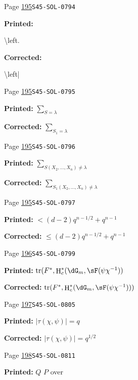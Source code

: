 \documentclass[oneside]{book}
\DeclareMathOperator{\h}{H}
\DeclareMathOperator{\tr}{tr}
\theoremstyle{sga-source}
\theoremstyle{sga-source-dash}
\theoremstyle{sga-source-dotdash}
\theoremstyle{sga-source-number-note-dash}
\theoremstyle{sga-source-note-number-dotdash}
\theoremstyle{sga-source-example-dotdash}
\theoremstyle{sga-source-inline-number}
\theoremstyle{sga-source-bare-number}
\theoremstyle{sga-source}
\begin{document}
\begin{description}
\smallskip
\item[\hypertarget{apparatus:EN-0125}{125}] Page \hyperlink{printpage:en:195}{195}\quad\texttt{S45-SOL-0794}
\par\noindent\textbf{Printed:} {\footnotesize\ttfamily\raggedright \textbackslash{}\allowbreak{}left.\par}
\par\noindent\textbf{Corrected:} {\footnotesize\ttfamily\raggedright \textbackslash{}\allowbreak{}left|\par}
\smallskip
\item[\hypertarget{apparatus:EN-0126}{126}] Page \hyperlink{printpage:en:195}{195}\quad\texttt{S45-SOL-0795}
\par\noindent\textbf{Printed:} \(\sum_{S=\lambda}\)
\par\noindent\textbf{Corrected:} \(\sum_{S_1=\lambda}\)
\smallskip
\item[\hypertarget{apparatus:EN-0127}{127}] Page \hyperlink{printpage:en:195}{195}\quad\texttt{S45-SOL-0796}
\par\noindent\textbf{Printed:} \(\sum_{S(X_2,\dots,X_n)\ne\lambda}\)
\par\noindent\textbf{Corrected:} \(\sum_{S_1(X_2,\dots,X_n)\ne\lambda}\)
\smallskip
\item[\hypertarget{apparatus:EN-0128}{128}] Page \hyperlink{printpage:en:195}{195}\quad\texttt{S45-SOL-0797}
\par\noindent\textbf{Printed:} \(< (d-2) q^{n-1/2} + q^{n-1}\)
\par\noindent\textbf{Corrected:} \(\leqslant (d-2) q^{n-1/2} + q^{n-1}\)
\smallskip
\item[\hypertarget{apparatus:EN-0129}{129}] Page \hyperlink{printpage:en:196}{196}\quad\texttt{S45-SOL-0799}
\par\noindent\textbf{Printed:} \(\tr(F^\ast,\h_c^\ast(\dG_m,\sF(\psi \chi^{-1}))\)
\par\noindent\textbf{Corrected:} \(\tr(F^\ast,\h_c^\ast(\dG_m,\sF(\psi \chi^{-1})))\)
\smallskip
\item[\hypertarget{apparatus:EN-0130}{130}] Page \hyperlink{printpage:en:197}{197}\quad\texttt{S45-SOL-0805}
\par\noindent\textbf{Printed:} \(|\tau(\chi,\psi)|=q\)
\par\noindent\textbf{Corrected:} \(|\tau(\chi,\psi)|=q^{1/2}\)
\smallskip
\item[\hypertarget{apparatus:EN-0131}{131}] Page \hyperlink{printpage:en:198}{198}\quad\texttt{S45-SOL-0811}
\par\noindent\textbf{Printed:} $Q$ $P$ over

\end{description}
\end{document}
